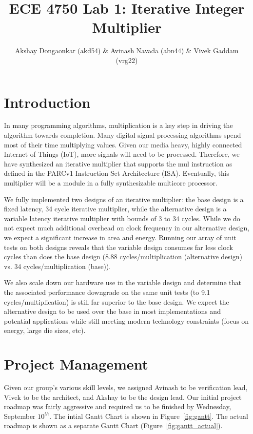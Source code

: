 \documentclass[11pt]{article}
\begin{document}
\title{ECE 4750 Lab 1: Iterative Integer Multiplier}
\author{Akshay Dongaonkar (akd54) \& Avinash Navada (abn44) \& Vivek Gaddam (vrg22)}
\maketitle

\section{Introduction}

In many programming algorithms, multiplication is a key step in driving the algorithm towards completion. 
Many digital signal processing algorithms spend most of their time multiplying values. 
Given our media heavy, highly connected Internet of Things (IoT), more signals will need to be processed.
Therefore, we have synthesized an iterative multiplier that supports the mul instruction as defined in the PARCv1 Instruction Set Architecture (ISA).
Eventually, this multiplier will be a module in a fully synthesizable multicore processor.

We fully implemented two designs of an iterative multiplier: the base design is a fixed latency, 34 cycle iterative multiplier, while the alternative design is a variable latency iterative multiplier with bounds of 3 to 34 cycles.
While we do not expect much additional overhead on clock frequency in our alternative design,
we expect a significant increase in area and energy. Running our array of unit tests on both designs reveals that the variable design consumes far less clock cycles than does the base design (8.88 cycles/multiplication (alternative design) vs. 34 cycles/multiplication (base)).

We also scale down our hardware use in the variable design and determine that the associated performance downgrade on the same unit tests (to 9.1 cycles/multiplication) is still far superior to the base design. We expect the alternative design to be used over the base in most implementations and potential applications while still meeting modern technology constraints (focus on energy, large die sizes, etc).
  


\section{Project Management}

Given our group's various skill levels, we assigned Avinash to be verification lead, Vivek to be the architect, and Akshay to be the design lead.
Our initial project roadmap was fairly aggressive and required us to be finished by Wednesday, September $10^{th}$.
The intial Gantt Chart is shown in Figure~\ref{fig:gantt}. The actual roadmap is shown as a separate Gantt Chart (Figure~\ref{fig:gantt_actual}).
\end{document}
